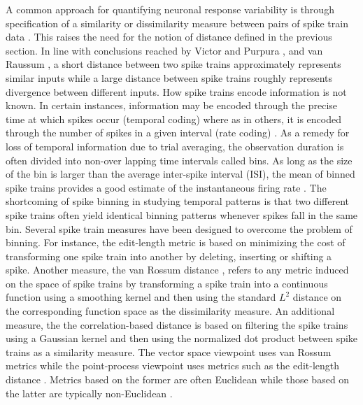 A common approach for quantifying neuronal response variability is through specification of a  similarity or dissimilarity measure between pairs of spike train data \cite{Brown2004, Victor1996, Victor1998,Rossum2001,houghton2010measuring}.
This raises the need for the notion of distance defined in the previous section. In line with conclusions reached by Victor and Purpura \cite{Victor1996, Victor1998}, and van Raussum \cite{Rossum2001}, a short distance between two spike trains approximately represents similar inputs while a large distance between spike trains roughly represents divergence between different inputs.
How spike trains encode information is not known. In certain instances, information may be encoded through the precise time at which spikes occur (temporal coding) where as in others, it is encoded through the number of spikes in a given interval (rate coding) \cite{Abbott2001}.
As a remedy for loss of temporal information due to trial averaging, the observation duration is often divided into non-over lapping time intervals called bins. As long as the size of the bin is larger than the average inter-spike interval (ISI), the mean of binned spike trains provides a good estimate of the instantaneous firing rate \cite{Brown2004}. The shortcoming of spike binning in studying temporal patterns is that two different spike trains often yield identical binning patterns whenever spikes fall in the same bin. Several spike train measures have been designed to overcome the problem of binning. For instance, the edit-length metric \cite{Victor1996, Victor1998} is based on minimizing the cost of transforming one spike train into another by deleting, inserting or shifting a spike. Another measure, the van Rossum distance \cite{Rossum2001,houghton2010measuring}, refers to any metric induced on the space of spike trains by transforming a spike train into a continuous function using a smoothing kernel and then using the standard $L^2$ distance on the corresponding function space as the dissimilarity measure. An additional measure, the the correlation-based distance \cite{Schreiber2003} is based on filtering the spike trains using a Gaussian kernel and then using the normalized dot product between  spike trains as a  similarity measure.
The vector space viewpoint uses van Rossum metrics while the point-process viewpoint uses metrics such as the edit-length distance \cite{Victor2005}. 
Metrics based on the former are often Euclidean while those based on the latter are typically non-Euclidean \cite{Aronov2004}.\\


